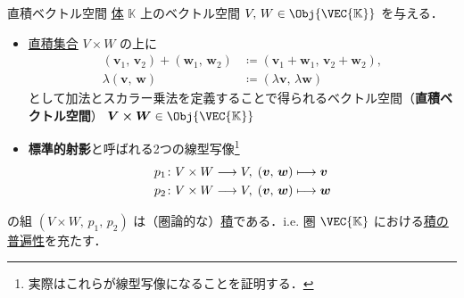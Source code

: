 \documentclass[geometry_main]{subfiles}
\begin{document}
\begin{myprop}[label=prop:product-vec, breakable]{直積ベクトル空間}
	\hyperref[ax:ring]{体} $\mathbb{K}$ 上のベクトル空間 $V,\, W \in \Obj{\VEC{\mathbb{K}}}$ を与える．
	\begin{itemize}
		\item \hyperref[prop:product-sets]{直積集合} $V \times W$ の上に
		\begin{align}
			(\bm{v}_1,\,  \bm{v}_2) + (\bm{w}_1,\, \bm{w}_2) &\coloneqq (\bm{v}_1 + \bm{w}_1,\, \bm{v}_2 + \bm{w}_2), \\
			\lambda (\bm{v},\,  \bm{w}) &\coloneqq (\lambda \bm{v},\, \lambda \bm{w})
		\end{align}
		として加法とスカラー乗法を定義することで得られるベクトル空間（\textbf{直積ベクトル空間}） $\bm{V \times W} \in \Obj{\VEC{\mathbb{K}}}$
		\item \textbf{標準的射影}と呼ばれる2つの線型写像\footnote{実際はこれらが線型写像になることを証明する．}
		\begin{align}
			p_1 \colon V \times W &\longrightarrow V,\; (\bm{v},\, \bm{w}) \longmapsto \bm{v} \\
			p_2 \colon V \times W &\longrightarrow V,\; (\bm{v},\, \bm{w}) \longmapsto \bm{w}
		\end{align}
	\end{itemize}
	の組 $(V \times W,\, p_1,\, p_2)$ は（圏論的な）\hyperref[def:product]{積}である．i.e. 圏 $\VEC{\mathbb{K}}$ における\hyperref[cmtd:univ-product]{積の普遍性}を充たす．
\end{myprop}

\end{document}
